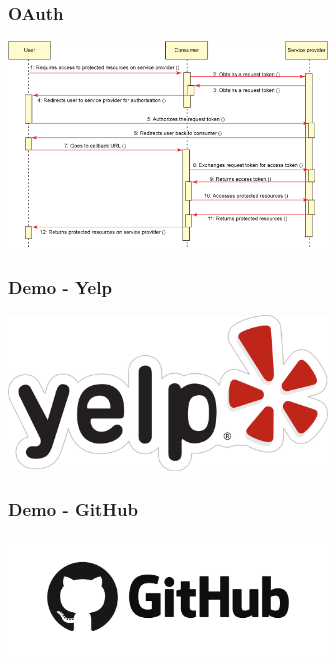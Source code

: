 \documentclass{beamer}
\begin{document}
\begin{frame}
  \frametitle{OAuth}
  \begin{center}
    \includegraphics[width=320]{oauth-seq.png}
  \end{center}
\end{frame}


\begin{frame}
  \frametitle{Demo - Yelp}
  \begin{center}
    \includegraphics[width=320]{yelp-logo.png}
  \end{center}
\end{frame}


\begin{frame}
  \frametitle{Demo - GitHub}
  \begin{center}
    \includegraphics[width=320]{github-logo.png}
  \end{center}
\end{frame}
\end{document}
